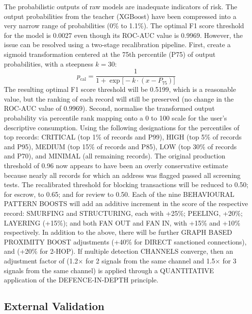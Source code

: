 \documentclass[journal]{IEEEtran}
\begin{document}
The probabilistic outputs of raw models are inadequate indicators of risk. The output probabilities from the teacher (XGBoost) have been compressed into a very narrow range of probabilities (0\% to 1.1\%). The optimal F1 score threshold for the model is 0.0027 even though its ROC-AUC value is 0.9969. However, the issue can be resolved using a two-stage recalibration pipeline. First, create a sigmoid transformation centered at the 75th percentile (P75) of output probabilities, with a steepness $k = 30$:
\begin{equation}
p_{\text{cal}} = \frac{1}{1 + \exp\!\bigl[-k \cdot (x - P_{75})\bigr]}
\label{eq:recalibration}
\end{equation}
The resulting optimal F1 score threshold will be 0.5199, which is a reasonable value, but the ranking of each record will still be preserved (no change in the ROC-AUC value of 0.9969). Second, normalise the transformed output probability via percentile rank mapping onto a 0 to 100 scale for the user's descriptive consumption. Using the following designations for the percentiles of top records: CRITICAL (top 1\% of records and P99), HIGH (top 5\% of records and P95), MEDIUM (top 15\% of records and P85), LOW (top 30\% of records and P70), and MINIMAL (all remaining records). The original production threshold of 0.96 now appears to have been an overly conservative estimate because nearly all records for which an address was flagged passed all screening tests. The recalibrated threshold for blocking transactions will be reduced to 0.50; for escrow, to 0.65; and for review to 0.50. Each of the nine BEHAVIOURAL PATTERN BOOSTS will add an additive increment in the score of the respective record: SMURFING and STRUCTURING, each with +25\%; PEELING, +20\%; LAYERING (+15\%); and both FAN OUT and FAN IN, with +15\% and +10\% respectively. In addition to the above, there will be further GRAPH BASED PROXIMITY BOOST adjustments (+40\% for DIRECT sanctioned connections), and (+20\% for 2-HOP). If multiple detection CHANNELS converge, then an adjustment factor of (1.2$\times$ for 2 signals from the same channel and 1.5$\times$ for 3 signals from the same channel) is applied through a QUANTITATIVE application of the DEFENCE-IN-DEPTH principle.

\subsection{External Validation}
\end{document}
